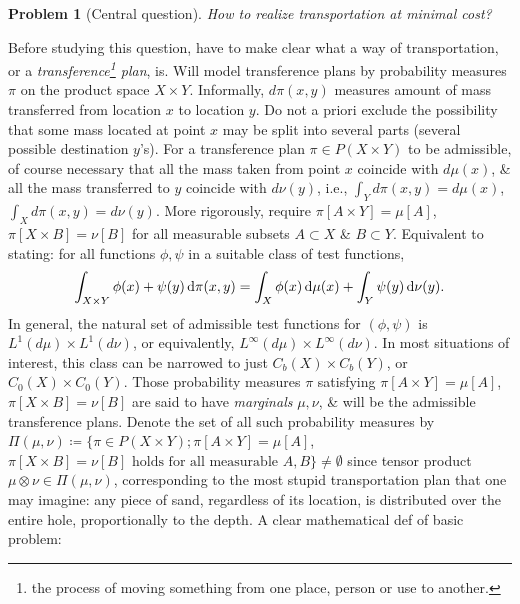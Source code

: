 \documentclass{article}
\newtheorem{problem}{Problem}
\begin{document}
\begin{enumerate}
\begin{itemize}
		\begin{problem}[Central question]
			How to realize transportation at minimal cost?
		\end{problem}
		Before studying this question, have to make clear what a way of transportation, or a {\it transference\footnote{the process of moving something from one place, person or use to another.} plan}, is. Will model transference plans by probability measures $\pi$ on the product space $X\times Y$. Informally, $d\pi(x,y)$ measures amount of mass transferred from location $x$ to location $y$. Do not a priori exclude the possibility that some mass located at point $x$ may be split into several parts (several possible destination $y$'s). For a transference plan $\pi\in P(X\times Y)$ to be admissible, of course necessary that all the mass taken from point $x$ coincide with $d\mu(x)$, \& all the mass transferred to $y$ coincide with $d\nu(y)$, i.e., $\int_Y d\pi(x,y) = d\mu(x)$, $\int_X d\pi(x,y) = d\nu(y)$. More rigorously, require $\pi[A\times Y] = \mu[A]$, $\pi[X\times B] = \nu[B]$ for all measurable subsets $A\subset X$ \& $B\subset Y$. Equivalent to stating: for all functions $\phi,\psi$ in a suitable class of test functions,
		\begin{equation}
			\int_{X\times Y} \phi(x) + \psi(y)\,{\rm d}\pi(x,y) = \int_X \phi(x)\,{\rm d}\mu(x) + \int_Y \psi(y)\,{\rm d}\nu(y).
		\end{equation}
		In general, the natural set of admissible test functions for $(\phi,\psi)$ is $L^1(d\mu)\times L^1(d\nu)$, or equivalently, $L^\infty(d\mu)\times L^\infty(d\nu)$. In most situations of interest, this class can be narrowed to just $C_b(X)\times C_b(Y)$, or $C_0(X)\times C_0(Y)$. Those probability measures $\pi$ satisfying $\pi[A\times Y] = \mu[A]$, $\pi[X\times B] = \nu[B]$ are said to have {\it marginals} $\mu,\nu$, \& will be the admissible transference plans. Denote the set of all such probability measures by $\Pi(\mu,\nu)\coloneqq\{\pi\in P(X\times Y);\pi[A\times Y] = \mu[A]$, $\pi[X\times B] = \nu[B]\mbox{ holds for all measurable } A,B\}\ne\emptyset$ since tensor product $\mu\otimes\nu\in\Pi(\mu,\nu)$, corresponding to the most stupid transportation plan that one may imagine: any piece of sand, regardless of its location, is distributed over the entire hole, proportionally to the depth. A clear mathematical def of basic problem:


\end{itemize}
\end{enumerate}
\end{document}
